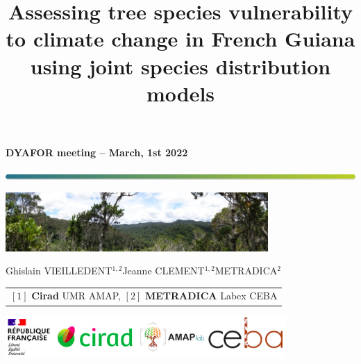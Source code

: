 \documentclass[
  10pt,
  ignorenonframetext,
  table, dvipsname, compress]{beamer}
\title[JSDM-Metradica]{Assessing tree species vulnerability to climate change in French Guiana using joint species distribution models}
\author{}
\date{\vspace{-2.5em}}
\author{}
\date{}
\begin{document}

{
  \begin{frame}
  \begin{center}
  \small{\textbf{DYAFOR meeting -- March, 1st 2022}}
  \end{center}
  \vspace{-0.5cm}
  \titlepage %
  \vspace{-3cm}
  \begin{center}
    \includegraphics[width=\textwidth]{figs/Barre_couleur}
    
    \vspace{0.25cm}
    
    \includegraphics[width=10cm]{figs/Banniere}
    
    \small{Ghislain VIEILLEDENT$^{1, 2}$\hspace{0.25cm}Jeanne CLEMENT$^{1, 2}$\hspace{0.25cm}METRADICA$^{2}$}
      
    \vspace{0.25cm}
    
    {\scriptsize
      \begin{tabular}{l}
        $[1]$ \textbf{Cirad} UMR AMAP, $[2]$ \textbf{METRADICA} Labex CEBA
      \end{tabular}
    }
    
    \includegraphics[width=0.8\textwidth]{figs/partners_logos}
    
  \end{center}
  \end{frame}
}
\end{document}
